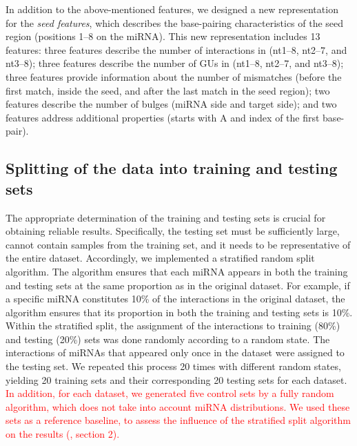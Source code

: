 \documentclass{bmcart}
\begin{document}
In addition to the above-mentioned features, we designed a new representation for the \textit{seed features}, which describes the base-pairing characteristics of the seed region (positions 1--8 on the miRNA). This new representation includes 13 features: three features describe the number of interactions in (nt1--8, nt2--7, and nt3--8); three features describe the number of GUs in (nt1--8, nt2--7, and nt3--8); three features provide information about the number of mismatches (before the first match, inside the seed, and after the last match in the seed region); two features describe the number of bulges (miRNA side and target side); and two features address additional properties (starts with A and index of the first base-pair).


\subsection*{Splitting of the data into training and testing sets} \label{method:split}
The appropriate determination of the training and testing sets is crucial for obtaining reliable results. Specifically, the testing set must be sufficiently large, cannot contain samples from the training set, and it needs to be representative of the entire dataset. 
Accordingly, we implemented a stratified random split algorithm. The algorithm ensures that each miRNA appears in both the training and testing sets at the same proportion as in the original dataset. For example, if a specific miRNA constitutes 10\% of the interactions in the original dataset, the algorithm ensures that its proportion in both the training and testing sets is 10\%. Within the stratified split, the assignment of the interactions to training (80\%) and testing (20\%) sets was done randomly according to a random state. The interactions of miRNAs that appeared only once in the dataset were assigned to the testing set.
We repeated this process 20 times with different random states, yielding 20 training sets and their corresponding 20 testing sets for each dataset. 
\textcolor{red}{In addition, for each dataset, we generated five control sets by a fully random algorithm, which does not take into account miRNA distributions. We used these sets as a reference baseline, to assess the influence of the stratified split algorithm on the results (, section 2). }
\end{document}
